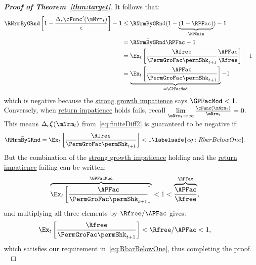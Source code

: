 \documentclass[\econtexRoot/BufferStockTheory]{subfiles}
\begin{document}
\begin{proof}[\textbf{Proof of Theorem~\ref{thm:target}}]
%
It follows that:
%
\begin{align*}
  \bar{\RNrmByGRnd}\left[1-\frac{\Delta_{\epsilon}\cFunc^{\prime}({\mNrm}_t)}{\epsilon}\right]- 1 & \leq  \bar{\RNrmByGRnd}(1-\underbrace{(1-\RPFac)}_{\MPCmin}) - 1  \\
                                                            & = \bar{\RNrmByGRnd}\RPFac - 1 \\
                                                            & = \Ex_{t}\left[\frac{\Rfree}{\PermGroFac \permShk_{t+1}}\frac{\APFac}{\Rfree}\right] - 1 \\
                                                            & = \underbrace{\Ex_{t}\left[\frac{\APFac}{\PermGroFac \permShk_{t+1}}\right]}_{= \GPFacMod} - 1 
\end{align*}
%
which is negative because the \hyperlink{GICMod}{strong growth impatience} says $\GPFacMod < 1$.
Conversely, when \hyperlink{RIC}{return impatience} holds fails, recall $\lim\limits_{\mNrm_{t} \rightarrow \infty} \frac{\cFunc(\mNrm_{t})}{\mNrm_{t}} = 0$.
This means $ \Delta_{\epsilon}\difFunc(\mNrm_{t})$ from~\eqref{eq:finiteDiff2} is guaranteed to be negative if:
%
\begin{equation}\begin{gathered}\begin{aligned}
  \bar{\RNrmByGRnd} = \Ex_{t}\left[\frac{\Rfree}{\PermGroFac \permShk_{t+1}}\right] & < 1  \labelsafe{eq:RbarBelowOne}.
\end{aligned}\end{gathered}\end{equation}
%
But the combination of the \hyperlink{GICMod}{strong growth impatience} holding and the \hyperlink{RIC}{return impatience} failing can be written:
%
\begin{equation}\begin{gathered}\begin{aligned}\label{eq:GICStrRICfailst1}
  \overbrace{\Ex_{t}\left[\frac{\APFac}{\PermGroFac \permShk_{t+1}}\right]}^{\GPFacMod} & < 1 < \overbrace{\frac{\APFac}{\Rfree}}^{{\RPFac}},
\end{aligned}\end{gathered}\end{equation}
%
and multiplying all three elements by $\Rfree/\APFac$ gives:
%
\begin{equation}\begin{gathered}\begin{aligned}\label{eq:GICStrRICfailst2}
  \Ex_{t}\left[\frac{\Rfree}{\PermGroFac \permShk_{t+1}}\right] & < \Rfree/\APFac < 1,
\end{aligned}\end{gathered}\end{equation}
%
which satisfies our requirement in~\eqref{eq:RbarBelowOne}, thus completing the proof.
\


\end{proof}
  
\end{document}
